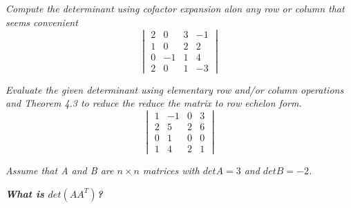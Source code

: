 \documentclass[12pt,letterpaper]{hmcpset}
\begin{document}
\section*{}





\begin{problem}[4.2.14]
\textit{Compute the determinant using cofactor expansion alon any row or column that seems convenient}
$$
\begin{vmatrix}
2&0&3&-1\\
1&0&2&2\\
0&-1&1&4\\
2&0&1&-3
\end{vmatrix}
$$
\end{problem}

\begin{solution}
\end{solution}

\newpage



\begin{problem}[4.2.24]
\textit{Evaluate the given determinant using elementary row and/or column operations and Theorem 4.3 to reduce the reduce the matrix to row echelon form. }
$$
\begin{vmatrix}
1&-1&0&3\\
2&5&2&6\\
0&1&0&0\\
1&4&2&1
\end{vmatrix}
$$
\end{problem}
\begin{solution}
\end{solution}

\newpage



\begin{problem}[4.2.52]
\textit{Assume that A and B are $ n\times n$ matrices with $det A =3 $ and $det B = -2$.}
\begin{center}
\textbf{\textit{What is $det(AA^T)$?}}
\end{center}
\end{problem}
\end{document}
